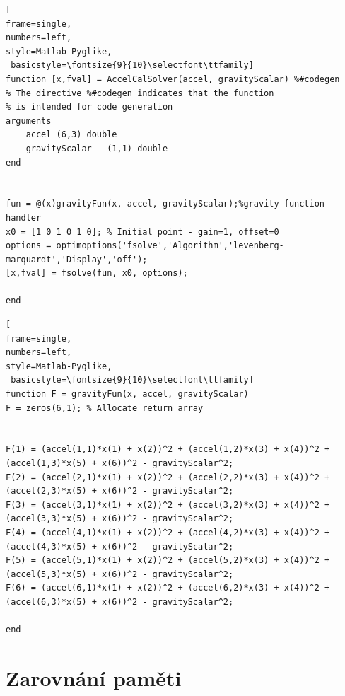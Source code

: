 \begin{lstlisting}[
frame=single,
numbers=left,
style=Matlab-Pyglike,
 basicstyle=\fontsize{9}{10}\selectfont\ttfamily]
function [x,fval] = AccelCalSolver(accel, gravityScalar) %#codegen
% The directive %#codegen indicates that the function
% is intended for code generation
arguments
    accel (6,3) double
    gravityScalar   (1,1) double
end


fun = @(x)gravityFun(x, accel, gravityScalar);%gravity function handler
x0 = [1 0 1 0 1 0]; % Initial point - gain=1, offset=0
options = optimoptions('fsolve','Algorithm','levenberg-marquardt','Display','off');
[x,fval] = fsolve(fun, x0, options);

end
\end{lstlisting}


\begin{lstlisting}[
frame=single,
numbers=left,
style=Matlab-Pyglike,
 basicstyle=\fontsize{9}{10}\selectfont\ttfamily]
function F = gravityFun(x, accel, gravityScalar)
F = zeros(6,1); % Allocate return array


F(1) = (accel(1,1)*x(1) + x(2))^2 + (accel(1,2)*x(3) + x(4))^2 + (accel(1,3)*x(5) + x(6))^2 - gravityScalar^2;
F(2) = (accel(2,1)*x(1) + x(2))^2 + (accel(2,2)*x(3) + x(4))^2 + (accel(2,3)*x(5) + x(6))^2 - gravityScalar^2;
F(3) = (accel(3,1)*x(1) + x(2))^2 + (accel(3,2)*x(3) + x(4))^2 + (accel(3,3)*x(5) + x(6))^2 - gravityScalar^2;
F(4) = (accel(4,1)*x(1) + x(2))^2 + (accel(4,2)*x(3) + x(4))^2 + (accel(4,3)*x(5) + x(6))^2 - gravityScalar^2;
F(5) = (accel(5,1)*x(1) + x(2))^2 + (accel(5,2)*x(3) + x(4))^2 + (accel(5,3)*x(5) + x(6))^2 - gravityScalar^2;
F(6) = (accel(6,1)*x(1) + x(2))^2 + (accel(6,2)*x(3) + x(4))^2 + (accel(6,3)*x(5) + x(6))^2 - gravityScalar^2;

end
\end{lstlisting}



\section{Zarovnání paměti}



